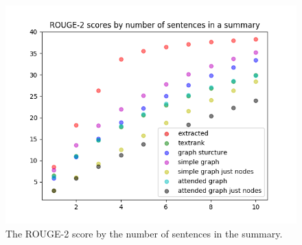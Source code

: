\FloatBarrier

\begin{figure}[!ht]
	\centering
	\includegraphics[width=150mm, keepaspectratio]{figures/ROUGE_2.png}
	\caption{The ROUGE-2 score  by the number of sentences in the summary.}
	\label{fig:ROUGE-2}
\end{figure}

